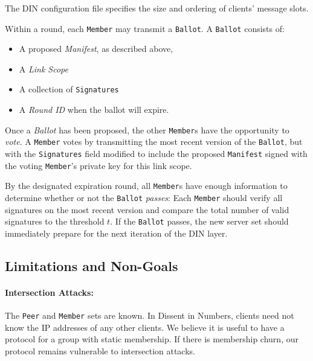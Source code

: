 The DIN configuration file specifies the size and ordering of clients' message
slots.


Within a round, each \texttt{Member} may  transmit a \texttt{Ballot}. A \texttt{Ballot}
consists of:
\begin{itemize}
  \item A proposed \emph{Manifest}, as described above,
  \item A \emph{Link Scope}
  \item A collection of \texttt{Signatures}
  \item A \emph{Round ID} when the ballot will expire.
\end{itemize}

Once a \emph{Ballot} has been proposed, the other \texttt{Member}s have the
opportunity to \emph{vote}. A \texttt{Member} votes by transmitting the most
recent version of the \texttt{Ballot}, but with the \texttt{Signatures} field
modified to include the proposed \texttt{Manifest} signed with the voting
\texttt{Member}'s private key for this link scope.

By the designated expiration round, all \texttt{Member}s have enough
information to determine whether or not the \texttt{Ballot} \emph{passes}:
Each \texttt{Member} should verify all signatures on the most recent
version
and compare the total number of valid signatures to the threshold $t$. If the
\texttt{Ballot} passes, the new server set should immediately prepare for the
next iteration of the DIN layer.

\subsection{Limitations and Non-Goals}
  \paragraph{Intersection Attacks:} The \texttt{Peer} and \texttt{Member} sets are known. In Dissent in
    Numbers, clients need not know the IP addresses of any other clients. We
    believe it is useful to have a protocol for a group with static membership.
    If there is membership churn, our protocol remains vulnerable to
    intersection attacks.
